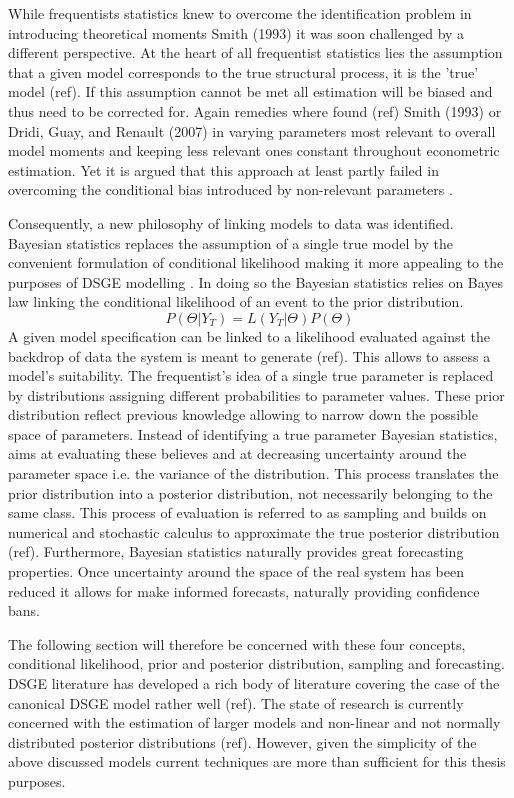 \documentclass[12pt,a4paper,english]{article} %
\begin{document}
	While frequentists statistics knew to overcome the identification problem in introducing theoretical moments Smith (1993) it was soon challenged by a different perspective. At the heart of all frequentist statistics lies the assumption that a given model corresponds to the true structural process, it is the 'true' model (ref). If this assumption cannot be met all estimation will be biased and thus need to be corrected for. Again remedies where found (ref) Smith (1993) or Dridi, Guay, and Renault (2007) in varying parameters most relevant to overall model moments and keeping less relevant ones constant throughout econometric estimation. Yet it is argued that this approach at least partly failed in overcoming the conditional bias introduced by non-relevant parameters \cite{guerron-quintana_bayesian_2013}.
	
	Consequently, a new philosophy of linking models to data was identified. Bayesian statistics replaces the assumption of a single true model by the convenient formulation of conditional likelihood making it more appealing to the purposes of DSGE modelling \cite{guerron-quintana_bayesian_2013}. In doing so the Bayesian statistics relies on Bayes law linking the conditional likelihood of an event to the prior distribution.
	\[
	P( \Theta | Y_{T}) = L(Y_{T} | \Theta) P(\Theta)
	\]
	A given model specification can be linked to a likelihood evaluated against the backdrop of data the system is meant to generate (ref). This allows to assess a model's suitability. The frequentist's idea of a single true parameter is replaced by distributions assigning different probabilities to parameter values. These prior distribution reflect previous knowledge allowing to narrow down the possible space of parameters. Instead of identifying a true parameter Bayesian statistics, aims at evaluating these believes and at decreasing uncertainty around the parameter space i.e. the variance of the distribution. This process translates the prior distribution into a posterior distribution, not necessarily belonging to the same class. 
	This process of evaluation is referred to as sampling and builds on numerical and stochastic calculus to approximate the true posterior distribution (ref). Furthermore, Bayesian statistics naturally provides great forecasting properties. Once uncertainty around the space of the real system has been reduced it allows for make informed forecasts, naturally providing confidence bans. 
	
	The following section will therefore be concerned with these four concepts, conditional likelihood, prior and posterior distribution, sampling and forecasting. DSGE literature has developed a rich body of literature covering the case of the canonical DSGE model rather well (ref). The state of research is currently concerned with the estimation of larger models and non-linear and not normally distributed posterior distributions (ref). However, given the simplicity of the above discussed models current techniques are more than sufficient for this thesis purposes.
	
\end{document}

